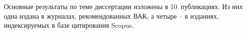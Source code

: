 \publications
%
%
Основные результаты по теме диссертации изложены в 10~публикациях.
Из них одна издана в журналах, рекомендованных ВАК,
а четыре \--- в изданиях, индексируемых в базе цитирования Scopus.





